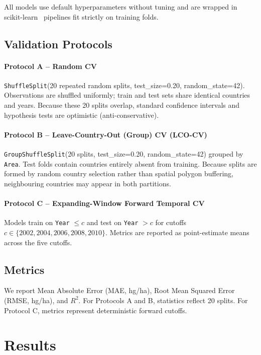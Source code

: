 \documentclass[conference]{IEEEtran}
\begin{document}
All models use default hyperparameters without tuning and are wrapped in 
scikit-learn~\cite{scikit-learn} pipelines fit strictly on training folds.

\subsection{Validation Protocols}

\paragraph{Protocol A -- Random CV}
\texttt{ShuffleSplit}(20 repeated random splits, test\_size=0.20, random\_state=42). 
Observations are shuffled uniformly; train and test sets share identical countries and years. 
Because these 20 splits overlap, standard confidence intervals and hypothesis tests 
are optimistic (anti-conservative).

\paragraph{Protocol B -- Leave-Country-Out (Group) CV (LCO-CV)}
\texttt{GroupShuffleSplit}(20 splits, test\_size=0.20, random\_state=42) grouped 
by \texttt{Area}. Test folds contain countries entirely absent from training. 
Because splits are formed by random country selection rather than spatial polygon 
buffering, neighbouring countries may appear in both partitions.

\paragraph{Protocol C -- Expanding-Window Forward Temporal CV}
Models train on \texttt{Year} $\leq c$ and test on \texttt{Year} $> c$ for 
cutoffs $c \in \{2002, 2004, 2006, 2008, 2010\}$. Metrics are reported as 
point-estimate means across the five cutoffs.

\subsection{Metrics}

We report Mean Absolute Error (MAE, hg/ha), Root Mean Squared Error 
(RMSE, hg/ha), and $R^2$. For Protocols A and B, statistics reflect 20 splits. 
For Protocol C, metrics represent deterministic forward cutoffs.

\section{Results}
\label{sec:results}
\end{document}
